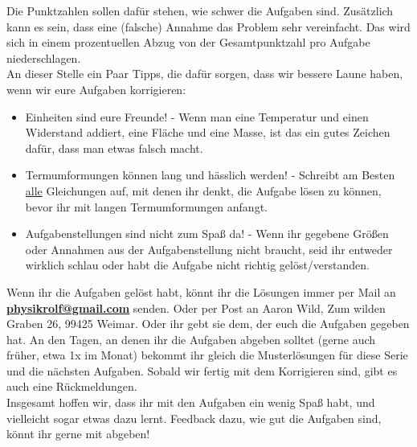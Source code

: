 \documentclass[a4paper]{article}
\begin{document}
Die Punktzahlen sollen dafür stehen, wie schwer die Aufgaben sind. Zusätzlich kann es sein, dass eine (falsche) Annahme das Problem sehr vereinfacht. Das wird sich in einem prozentuellen Abzug von der Gesamtpunktzahl pro Aufgabe niederschlagen.\\
An dieser Stelle ein Paar Tipps, die dafür sorgen, dass wir bessere Laune haben, wenn wir eure Aufgaben korrigieren:
\begin{itemize}
	\item Einheiten sind eure Freunde! - Wenn man eine Temperatur und einen Widerstand addiert, eine Fläche und eine Masse, ist das ein gutes Zeichen dafür, dass man etwas falsch macht.
	\item Termumformungen können lang und hässlich werden! - Schreibt am Besten \underline{alle} Gleichungen auf, mit denen ihr denkt, die Aufgabe lösen zu können, bevor ihr mit langen Termumformungen anfangt.
	\item Aufgabenstellungen sind nicht zum Spaß da! - Wenn ihr gegebene Größen oder Annahmen aus der Aufgabenstellung nicht braucht, seid ihr entweder wirklich schlau oder habt die Aufgabe nicht richtig gelöst/verstanden.
\end{itemize}
Wenn ihr die Aufgaben gelöst habt, könnt ihr die Lösungen immer per Mail an \textbf{ \href{mailto:physikrolf@gmail.com}{physikrolf@gmail.com}} senden. Oder per Post an Aaron Wild, Zum wilden Graben 26, 99425 Weimar. Oder ihr gebt sie dem, der euch die Aufgaben gegeben hat. An den Tagen, an denen ihr die Aufgaben abgeben solltet (gerne auch früher, etwa 1x im Monat) bekommt ihr gleich die Musterlösungen für diese Serie und die nächsten Aufgaben. Sobald wir fertig mit dem Korrigieren sind, gibt es auch eine Rückmeldungen.\\
Insgesamt hoffen wir, dass ihr mit den Aufgaben ein wenig Spaß habt, und vielleicht sogar etwas dazu lernt. Feedback dazu, wie gut die Aufgaben sind, könnt ihr gerne mit abgeben!
\end{document}

